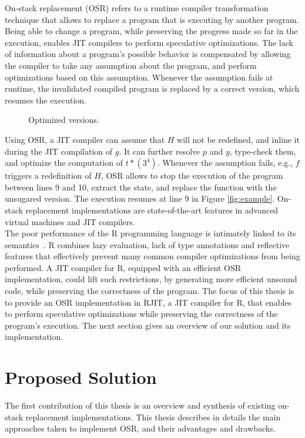 On-stack replacement (OSR) refers to a runtime compiler transformation technique that allows to replace a program that is executing by another program.
Being able to change a program, while preserving the progress made so far in the execution, enables JIT compilers to perform speculative optimizations.
The lack of information about a program’s possible behavior is compensated by allowing the compiler to take any assumption about the program, and perform optimizations based on this assumption.
Whenever the assumption fails at runtime, the invalidated compiled program is replaced by a correct version, which resumes the execution.\\

\begin{wrapfigure}[13]{l}{6.5cm}
\caption{Optimized versions.}
\end{wrapfigure}
Using OSR, a JIT compiler can assume that $H$ will not be redefined, and inline it during the JIT compilation of $g$.
It can further resolve $p$ and $y$, type-check them, and optimize the computation of $t * (3 ^ 4)$.
Whenever the assumption fails, e.g., $f$ triggers a redefinition of $H$, OSR allows to stop the execution of the program between lines 9 and 10, extract the state, and replace the function with the unsugared version.
The execution resumes at line 9 in Figure \ref{fig:example}.
On-stack replacement implementations are state-of-the-art features in advanced virtual machines and JIT compilers.\\

The poor performance of the R programming language is intimately linked to its semantics~\cite{morandat2012evaluating}. R combines lazy evaluation, lack of type annotations and reflective features that effectively prevent many common compiler optimizations from being performed.
A JIT compiler for R, equipped with an efficient OSR implementation, could lift such restrictions, by generating more efficient unsound code, while preserving the correctness of the program.
The focus of this thesis is to provide an OSR implementation in RJIT, a JIT compiler for R, that enables to perform speculative optimizations while preserving the correctness of the program's execution.
The next section gives an overview of our solution and its implementation.\\

\section{Proposed Solution}
The first contribution of this thesis is an overview and synthesis of existing on-stack replacement implementations.
This thesis describes in details the main approaches taken to implement OSR, and their advantages and drawbacks.\\


